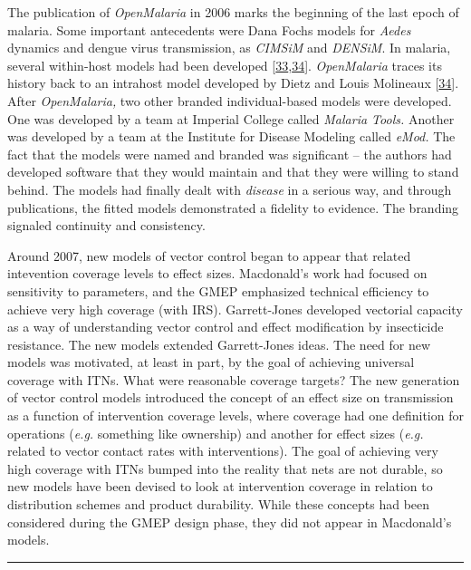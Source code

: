 \documentclass[
]{book}
\begin{document}
The publication of \emph{OpenMalaria} in 2006 marks the beginning of the last epoch of malaria. Some important antecedents were Dana Fochs models for \emph{Aedes} dynamics and dengue virus transmission, as \emph{CIMSiM} and \emph{DENSiM}. In malaria, several within-host models had been developed {[}\protect\hyperlink{ref-MolineauxL1999ReviewIntrahost}{33},\protect\hyperlink{ref-MolineauxL2001PlasmodiumFalciparum}{34}{]}. \emph{OpenMalaria} traces its history back to an intrahost model developed by Dietz and Louis Molineaux {[}\protect\hyperlink{ref-MolineauxL2001PlasmodiumFalciparum}{34}{]}. After \emph{OpenMalaria,} two other branded individual-based models were developed. One was developed by a team at Imperial College called \emph{Malaria Tools.} Another was developed by a team at the Institute for Disease Modeling called \emph{eMod.} The fact that the models were named and branded was significant -- the authors had developed software that they would maintain and that they were willing to stand behind. The models had finally dealt with \emph{disease} in a serious way, and through publications, the fitted models demonstrated a fidelity to evidence. The branding signaled continuity and consistency.

Around 2007, new models of vector control began to appear that related intevention coverage levels to effect sizes. Macdonald's work had focused on sensitivity to parameters, and the GMEP emphasized technical efficiency to achieve very high coverage (with IRS). Garrett-Jones developed vectorial capacity as a way of understanding vector control and effect modification by insecticide resistance. The new models extended Garrett-Jones ideas. The need for new models was motivated, at least in part, by the goal of achieving universal coverage with ITNs. What were reasonable coverage targets? The new generation of vector control models introduced the concept of an effect size on transmission as a function of intervention coverage levels, where coverage had one definition for operations (\emph{e.g.} something like ownership) and another for effect sizes (\emph{e.g.} related to vector contact rates with interventions). The goal of achieving very high coverage with ITNs bumped into the reality that nets are not durable, so new models have been devised to look at intervention coverage in relation to distribution schemes and product durability. While these concepts had been considered during the GMEP design phase, they did not appear in Macdonald's models.

\begin{center}\rule{0.5\linewidth}{0.5pt}\end{center}
\end{document}
